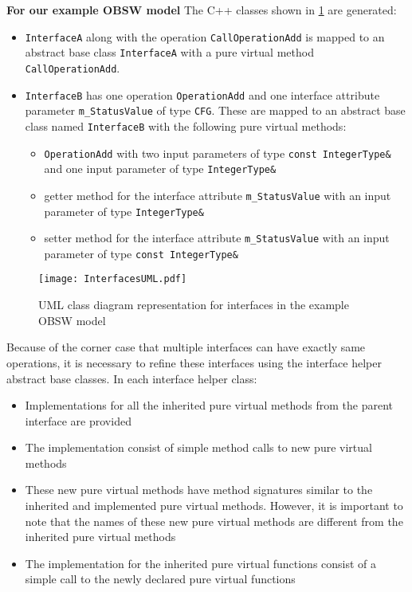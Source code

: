 \textbf{For our example OBSW model} The C++ classes shown in \cref{fig: InterfacesUML} are generated:
\begin{itemize}
\item \texttt{InterfaceA} along with the operation \texttt{CallOperationAdd} is mapped to an abstract base class \texttt{InterfaceA} with a pure virtual method \texttt{CallOperationAdd}. 
\item \texttt{InterfaceB} has one operation \texttt{OperationAdd} and one interface attribute parameter \texttt{m\_StatusValue} of type \texttt{CFG}. These are mapped to an abstract base class named \texttt{InterfaceB} with the following pure virtual methods:
\begin{itemize}
\item \texttt{OperationAdd} with two input parameters of type \texttt{const\allowbreak \ IntegerType\&} and one input parameter of type \texttt{IntegerType\&}
\item getter method for the interface attribute \texttt{m\_StatusValue} with an input parameter of type \texttt{IntegerType\&}
\item setter method for the interface attribute \texttt{m\_StatusValue} with an input parameter of type \texttt{const\allowbreak \ IntegerType\&}
\end{itemize} 
\end{itemize}

\begin{figure}[h]
	\centering
	\texttt{[image: InterfacesUML.pdf]}
	\caption{UML class diagram representation for interfaces in the example OBSW model}
	\label{fig: InterfacesUML}
\end{figure}

Because of the corner case that multiple interfaces can have exactly same operations, it is necessary to refine these interfaces using the interface helper abstract base classes. In each interface helper class:
\begin{itemize}
\item Implementations for all the inherited pure virtual methods from the parent interface are provided
\item The implementation consist of simple method calls to new pure virtual methods
\item These new pure virtual methods have method signatures similar to the inherited and implemented pure virtual methods. However, it is important to note that the names of these new pure virtual methods are different from the inherited pure virtual methods
\item The implementation for the inherited pure virtual functions consist of a simple call to the newly declared pure virtual functions
\end{itemize}

